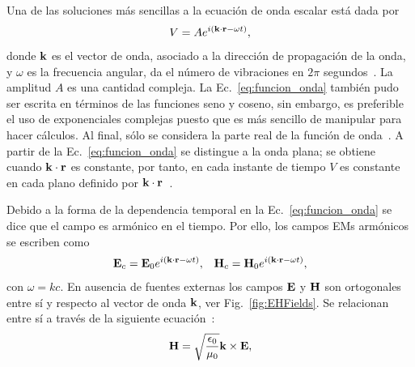 Una de las soluciones más sencillas a la ecuación de onda escalar está dada por~\cite{Griffiths}
\begin{equation}
	V=Ae^{i\left(\vb{k}\cdot\vb{r}-\omega t\right)},\label{eq:funcion_onda}
\end{equation}
donde $\vb{k}$ es el vector de onda, asociado a la dirección de propagación de la onda, y $\omega$ es la frecuencia angular, da el número de vibraciones en $2\pi$ segundos~\cite{BornWolf1980}. La amplitud $A$ es una cantidad compleja. La Ec.~\eqref{eq:funcion_onda} también pudo ser escrita en términos de las funciones seno y coseno, sin embargo, es preferible el uso de exponenciales complejas puesto que es más sencillo de manipular para hacer cálculos. Al final, sólo se considera la parte real de la función de onda~\cite{Griffiths}. A partir de la Ec.~\eqref{eq:funcion_onda} se distingue a la onda plana; se obtiene cuando $\vb{k}\cdot\vb{r}$ es constante, por tanto, en cada instante de tiempo $V$ es constante en cada plano definido por $\vb{k}\cdot\vb{r}$~\cite{Griffiths}. 

Debido a la forma de la dependencia temporal en la Ec.~\eqref{eq:funcion_onda} se dice que el campo es armónico en el tiempo. Por ello, los campos EMs armónicos se escriben como~\cite{Griffiths}
%
\begin{eqnarray}
	\vb{E}_{c}=\vb{E}_{0}e^{i\left(\vb{k}\cdot\vb{r}-\omega t\right)},&&\vb{H}_{c}=\vb{H}_{0}e^{i\left(\vb{k}\cdot\vb{r}-\omega t\right)},\label{eq:Campos_armo}
\end{eqnarray}
con $\omega=kc$. En ausencia de fuentes externas los campos $\vb{E}$ y $\vb{H}$ son ortogonales entre sí y respecto al vector de onda $\vb{k}$, ver Fig.~\ref{fig:EHFields}. Se relacionan entre sí a través de la siguiente ecuación~\cite{Griffiths}:
\begin{equation}
	\vb{H}=\sqrt{\frac{\epsilon_{0}}{\mu_{0}}}\vb{k}\times\vb{E},
\end{equation}

